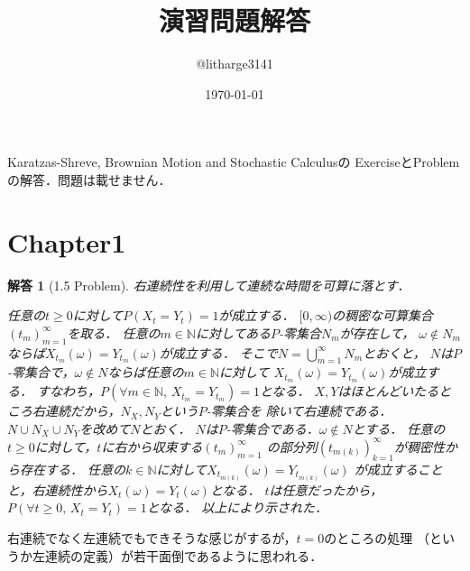 \documentclass[dvipdfmx,autodetect-engine]{jsarticle}
\newtheorem*{ans}{解答}
\theoremstyle{remark}
\theoremstyle{definition}
\newcommand{\N}{\mathbb{N}}
\begin{document}
\title{演習問題解答}
\author{@litharge3141}
\date{\today}
\maketitle

\abstract
Karatzas-Shreve, Brownian Motion and Stochastic Calculusの
ExerciseとProblemの解答．問題は載せません．

\section{Chapter1}
\begin{ans}[1.5 Problem]
    右連続性を利用して連続な時間を可算に落とす．

    任意の$t \geq 0$に対して$P(X_{t}=Y_{t})=1$が成立する．
    $[0,\infty)$の稠密な可算集合$(t_{m})_{m=1}^{\infty}$を取る．
    任意の$m \in \N$に対してある$P$-零集合$N_{m}$が存在して，
    $\omega \notin N_{m}$ならば$X_{t_{m}}(\omega) = Y_{t_{m}}(\omega)$が成立する．
    そこで$N = \bigcup_{m=1}^{\infty} N_{m}$とおくと，
    $N$は$P$-零集合で，$\omega \notin N$ならば任意の$m\in \N$に対して
    $X_{t_{m}}(\omega) = Y_{t_{m}}(\omega)$が成立する．
    すなわち，$P(\forall m\in \N,\, X_{t_{m}} = Y_{t_{m}})=1$となる．
    $X,Y$はほとんどいたるところ右連続だから，$N_{X},N_{Y}$という$P$-零集合を
    除いて右連続である．$N \cup N_{X} \cup N_{Y}$を改めて$N$とおく．
    $N$は$P$-零集合である．$\omega \notin N$とする．
    任意の$t \geq 0$に対して，$t$に右から収束する$(t_{m})_{m=1}^{\infty}$
    の部分列$(t_{m(k)})_{k=1}^{\infty}$が稠密性から存在する．
    任意の$k\in \N$に対して$X_{t_{m(k)}}(\omega) = Y_{t_{m(k)}}(\omega)$
    が成立することと，右連続性から$X_{t}(\omega) = Y_{t}(\omega)$となる．
    $t$は任意だったから，$P(\forall t\geq 0,\, X_{t}=Y_{t})=1$となる．
    以上により示された．
\end{ans}
右連続でなく左連続でもできそうな感じがするが，$t=0$のところの処理
（というか左連続の定義）が若干面倒であるように思われる．
\end{document}
